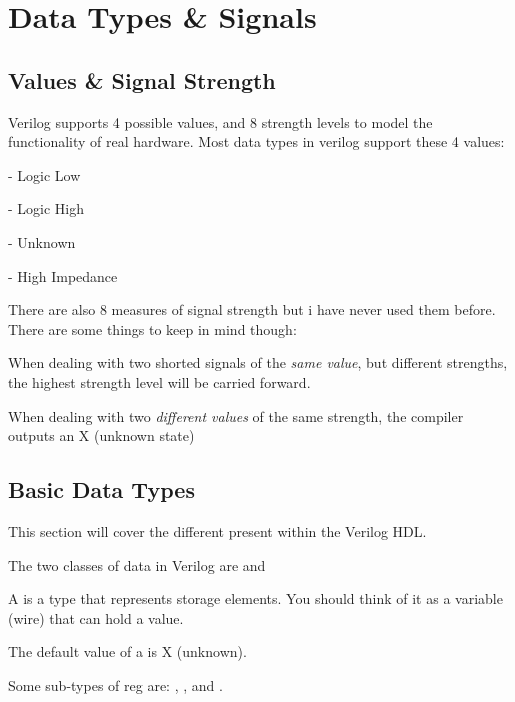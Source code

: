 \chapter{Data Types \& Signals}

\section{Values \& Signal Strength}

Verilog supports 4 possible values, and 8 strength levels to model the functionality of real hardware. Most data types in verilog support these 4 values:
\begin{bullets}
	\item {} - Logic Low
	\item {} - Logic High
	\item {} - Unknown
	\item {} - High Impedance
\end{bullets}

There are also 8 measures of signal strength but i have never used them before. There are some things to keep in mind though:
\begin{bullets}
	\item When dealing with two shorted signals of the \emph{same value}, but different strengths, the highest strength level will be carried forward.
	\item When dealing with two \emph{different values} of the same strength, the compiler outputs an X (unknown state)
\end{bullets}

\section{Basic Data Types}

This section will cover the different  present within the Verilog HDL.
\begin{bullets}
	\item The two classes of data in Verilog are  and 
\end{bullets}

A  is a type that represents storage elements. You should think of it as a variable (wire) that can hold a value. 
\begin{bullets}
	\item The default value of a  is X (unknown).
	\item Some sub-types of reg are: , , and .
\end{bullets}

